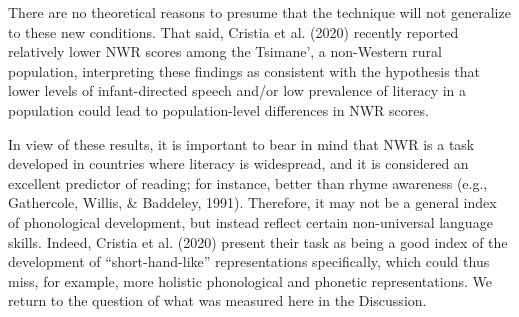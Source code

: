 \documentclass[
  american,
  ,man,floatsintext]{apa6}
\begin{document}
There are no theoretical reasons to presume that the technique will not generalize to these new conditions. That said, Cristia et al. (2020) recently reported relatively lower NWR scores among the Tsimane', a non-Western rural population, interpreting these findings as consistent with the hypothesis that lower levels of infant-directed speech and/or low prevalence of literacy in a population could lead to population-level differences in NWR scores.

In view of these results, it is important to bear in mind that NWR is a task developed in countries where literacy is widespread, and it is considered an excellent predictor of reading; for instance, better than rhyme awareness (e.g., Gathercole, Willis, \& Baddeley, 1991). Therefore, it may not be a general index of phonological development, but instead reflect certain non-universal language skills. Indeed, Cristia et al. (2020) present their task as being a good index of the development of ``short-hand-like'' representations specifically, which could thus miss, for example, more holistic phonological and phonetic representations. We return to the question of what was measured here in the Discussion.
\end{document}
